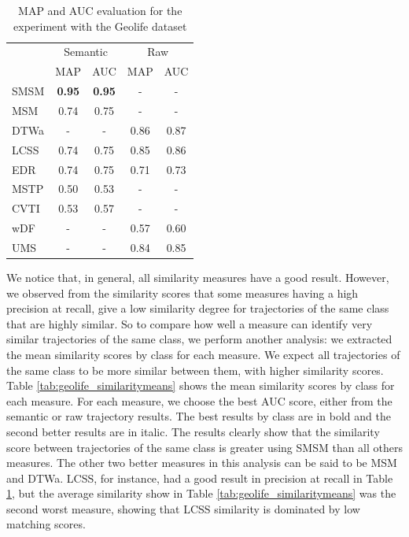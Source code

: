 \documentclass[12pt]{article}
\begin{document}
\begin{table}[ht!]
  \scriptsize
  \centering
  \begin{tabular}{|l|c|c|c|c|}
  	\hline
 & \multicolumn{2}{c}{Semantic}& \multicolumn{2}{|c|}{Raw}\\
 	\cline{2-5}
 & MAP & AUC& MAP & AUC\\
  	\hline
SMSM & \textbf{0.95} & \textbf{0.95} & - & -\\
 MSM & 0.74 & 0.75 & - & -\\
DTWa & - & - & 0.86 & 0.87\\
LCSS & 0.74 & 0.75 & 0.85 & 0.86\\
 EDR & 0.74 & 0.75 & 0.71 & 0.73\\
MSTP & 0.50 & 0.53 & - & -\\
CVTI & 0.53 & 0.57 & - & -\\
 wDF & - & - & 0.57 & 0.60\\
 UMS & - & - & 0.84 & 0.85\\
    \hline
  \end{tabular}
  \caption{MAP and AUC evaluation for the experiment with the Geolife dataset}
  \label{tab:geolife_measures_map_auc}
\end{table}

We notice that, in general, all similarity measures have a good result. However, we observed from the similarity scores that some measures having a high precision at recall, give a low similarity degree for trajectories of the same class that are highly similar. So to compare how well a measure can identify very similar trajectories of the same class, we perform another analysis: we extracted the mean similarity scores by class for each measure. We expect  all trajectories of the same class to be more similar between them, with higher similarity scores.
Table \ref{tab:geolife_similaritymeans} shows the mean similarity scores by class for each measure. For each measure, we choose the best AUC score, either from the semantic or raw trajectory results. The best results by class are in bold and the second better results are in italic. The results clearly show that the similarity score between trajectories of the same class is greater using SMSM than all others measures. The other two better measures in this analysis can be said to be MSM and DTWa. LCSS, for instance, had a good result in precision at recall in Table \ref{tab:geolife_measures_map_auc}, but the average similarity show in Table \ref{tab:geolife_similaritymeans} was the second worst measure, showing that LCSS similarity is dominated by low matching scores.
\end{document}
